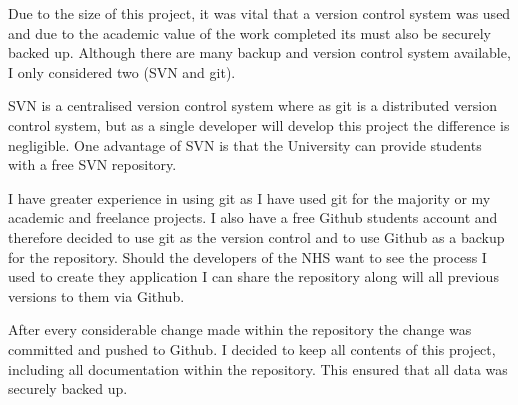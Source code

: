 Due to the size of this project, it was vital that a version control system was used and due to the academic value of the work completed its must also be securely backed up. Although there are many backup and version control system available, I only considered two (SVN and git).

SVN is a centralised version control system where as git \cite{git} is a distributed version control system, but as a single developer will develop this project the difference is negligible. One advantage of SVN is that the University can provide students with a free SVN repository.

I have greater experience in using git as I have used git for the majority or my academic and freelance projects. I also have a free Github students account and therefore decided to use git as the version control and to use Github \cite{github} as a backup for the repository. Should the developers of the NHS want to see the process I used to create they application I can share the repository along will all previous versions to them via Github.

After every considerable change made within the repository the change was committed and pushed to Github. I decided to keep all contents of this project, including all documentation within the repository. This ensured that all data was securely backed up.

